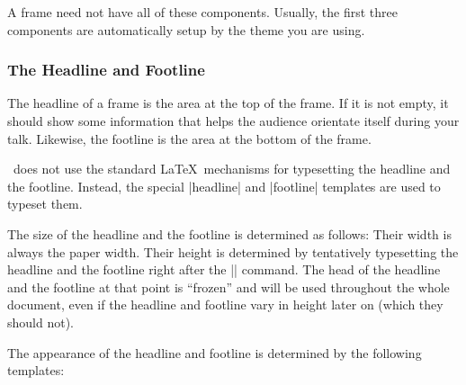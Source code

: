 A frame need not have all of these components. Usually, the first
three components are automatically setup by the theme you are using. 


\subsubsection{The Headline and Footline}

The headline of a frame is the area at the top of the frame. If it is
not empty, it should show some information that helps the audience
orientate itself during your talk. Likewise, the footline is the area
at the bottom of the frame.

\beamer\ does not use the standard \LaTeX\ mechanisms for typesetting
the headline and the footline. Instead, the special |headline| and
|footline| templates are used to typeset them.

The size of the headline and the footline is determined as follows:
Their width is always the paper width. Their height is determined by
tentatively typesetting the headline and the footline right after the
|| command. The head of the headline and the footline
at that point is ``frozen'' and will be used throughout the whole
document, even if the headline and footline vary in height later on
(which they should not).

The appearance of the headline and footline is determined by the
following templates:

